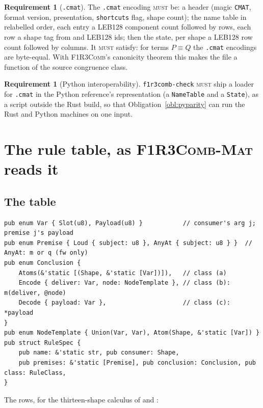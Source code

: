 \documentclass[11pt,a4paper]{article}
\newcommand{\code}[1]{\texttt{#1}}
\newcommand{\Comb}{\textsc{F1R3Comb}}
\newcommand{\Mat}{\textsc{F1R3Comb-Mat}}
\newcommand{\MUST}{\textsc{must}}
\newcommand{\scong}{\equiv}
\theoremstyle{definition}
\newtheorem{requirement}[definition]{Requirement}
\theoremstyle{plain}
\begin{document}
\begin{requirement}[\code{.cmat}]\label{req:cmat}
The \code{.cmat} encoding \MUST{} be: a header (magic \code{CMAT}, format
version, presentation, \code{shortcuts} flag, shape count); the name table in
relabelled order, each entry a LEB128 component count followed by rows, each
row a shape tag from \cite[\S4.5]{combspec} and LEB128 ids; then the
state, per shape a LEB128 row count followed by columns. It \MUST{} satisfy:
for terms $P \scong Q$ the \code{.cmat} encodings are byte-equal. With
\Comb's canonicity theorem \cite[Obl.~5.8]{combspec} this makes the file a
function of the source congruence class.
\end{requirement}

\begin{requirement}[Python interoperability]\label{req:pyinterop}
\code{f1r3comb-check} \MUST{} ship a loader for \code{.cmat} in the Python
reference's representation (a \code{NameTable} and a \code{State}), as a
script outside the Rust build, so that Obligation~\ref{obl:pyparity} can run
the Rust and Python machines on one input.
\end{requirement}

\section{The rule table, as \Mat{} reads it}\label{sec:rules}

\subsection{The table}

\begin{lstlisting}
pub enum Var { Slot(u8), Payload(u8) }           // consumer's arg j; premise j's payload
pub enum Premise { Loud { subject: u8 }, AnyAt { subject: u8 } }  // AnyAt: m or q (fw only)
pub enum Conclusion {
    Atoms(&'static [(Shape, &'static [Var])]),   // class (a)
    Encode { deliver: Var, node: NodeTemplate }, // class (b): m(deliver, @node)
    Decode { payload: Var },                     // class (c): *payload
}
pub enum NodeTemplate { Union(Var, Var), Atom(Shape, &'static [Var]) }
pub struct RuleSpec {
    pub name: &'static str, pub consumer: Shape,
    pub premises: &'static [Premise], pub conclusion: Conclusion, pub class: RuleClass,
}
\end{lstlisting}

\noindent
The rows, for the thirteen-shape calculus of \cite[Def.~3.3]{draft3} and
\cite[Def.~4.6]{combspec}:
\end{document}
